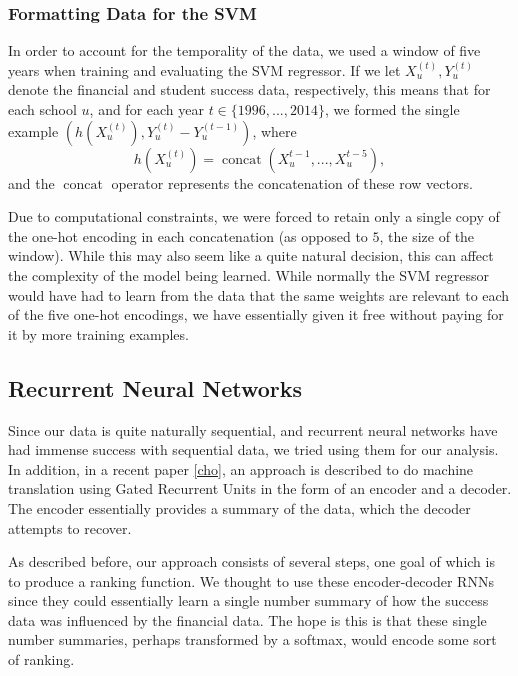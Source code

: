 \documentclass[paper.tex]{subfiles}
\begin{document}
\subsubsection{Formatting Data for the SVM}
In order to account for the temporality of the data, we used a window of five years when training and evaluating the SVM regressor. If we let $X_u^{(t)}, Y_u^{(t)}$ denote the financial and student success data, respectively, this means that for each school $u$, and for each year $t \in \{1996, ..., 2014\}$, we formed the single example $(h(X_u^{(t)}), Y_u^{(t)} - Y_u^{(t - 1)})$, where \[ h(X_u^{(t)}) = \operatorname{concat}(X_u^{t - 1}, ..., X_u^{t - 5}), \] and the $\operatorname{concat}$ operator represents the concatenation of these row vectors. 

Due to computational constraints, we were forced to retain only a single copy of the one-hot encoding in each concatenation (as opposed to $5$, the size of the window). While this may also seem like a quite natural decision, this can affect the complexity of the model being learned. While normally the SVM regressor would have had to learn from the data that the same weights are relevant to each of the five one-hot encodings, we have essentially given it free without paying for it by more training examples. 


\subsection{Recurrent Neural Networks} Since our data is quite naturally sequential, and recurrent neural networks have had immense success with sequential data, we tried using them for our analysis. In addition, in a recent paper \ref{cho}, an approach is described to do machine translation using Gated Recurrent Units in the form of an encoder and a decoder. The encoder essentially provides a summary of the data, which the decoder attempts to recover.

As described before, our approach consists of several steps, one goal of which is to produce a ranking function. We thought to use these encoder-decoder RNNs since they could essentially learn a single number summary of how the success data was influenced by the financial data. The hope is this is that these single number summaries, perhaps transformed by a softmax, would encode some sort of ranking.  
\end{document}

